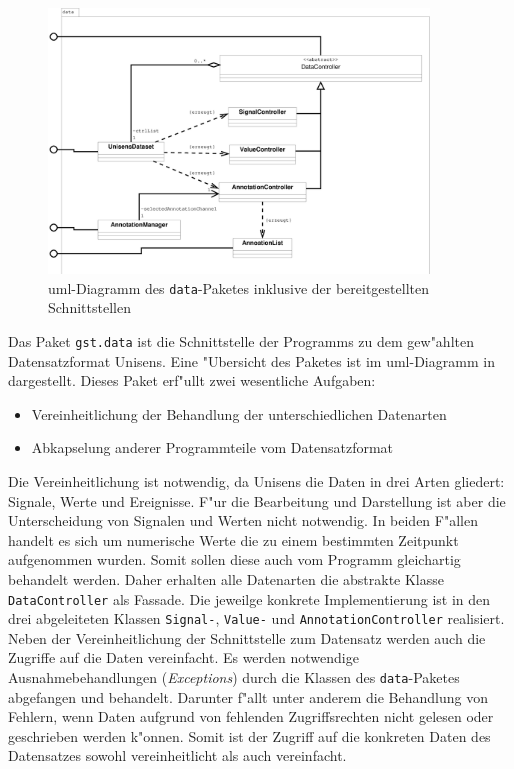 \begin{figure}[htb]
\centering
\includegraphics[width=0.9\textwidth]{bilder/prog_data_ubersicht.eps}
\caption[\ac{uml}-Diagramm des \texttt{data}-Paketes]{\ac{uml}-Diagramm des \texttt{data}-Paketes inklusive der bereitgestellten Schnittstellen}
\label{pic:data_package}
\end{figure}

Das Paket \verb|gst.data| ist die Schnittstelle der Programms zu dem gew"ahlten Datensatzformat Unisens.
Eine "Ubersicht des Paketes ist im \ac{uml}-Diagramm in  dargestellt.
Dieses Paket erf"ullt zwei wesentliche Aufgaben:
\begin{itemize}
	\item Vereinheitlichung der Behandlung der unterschiedlichen Datenarten
	\item Abkapselung anderer Programmteile vom Datensatzformat
\end{itemize}

Die Vereinheitlichung ist notwendig, da Unisens die Daten in drei Arten gliedert: Signale, Werte und Ereignisse.
F"ur die Bearbeitung und Darstellung ist aber die Unterscheidung von Signalen und Werten nicht notwendig.
In beiden F"allen handelt es sich um numerische Werte die zu einem bestimmten Zeitpunkt aufgenommen wurden.
Somit sollen diese auch vom Programm gleichartig behandelt werden.
Daher erhalten alle Datenarten die abstrakte Klasse \verb|DataController| als Fassade.
Die jeweilge konkrete Implementierung ist in den drei abgeleiteten Klassen \verb|Signal-|, \verb|Value-| und \verb|AnnotationController| realisiert.
Neben der Vereinheitlichung der Schnittstelle zum Datensatz werden auch die Zugriffe auf die Daten vereinfacht.
Es werden notwendige Ausnahmebehandlungen (\emph{Exceptions}) durch die Klassen des \verb|data|-Paketes abgefangen und behandelt.
Darunter f"allt unter anderem die Behandlung von Fehlern, wenn Daten aufgrund von fehlenden Zugriffsrechten nicht gelesen oder geschrieben werden k"onnen.
Somit ist der Zugriff auf die konkreten Daten des Datensatzes sowohl vereinheitlicht als auch vereinfacht.

